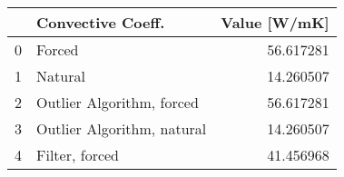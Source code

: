 \begin{tabular}{llr}
\toprule
{} &           Convective Coeff. &  Value [W/mK] \\
\midrule
0 &                      Forced &     56.617281 \\
1 &                     Natural &     14.260507 \\
2 &   Outlier Algorithm, forced &     56.617281 \\
3 &  Outlier Algorithm, natural &     14.260507 \\
4 &              Filter, forced &     41.456968 \\
\bottomrule
\end{tabular}
